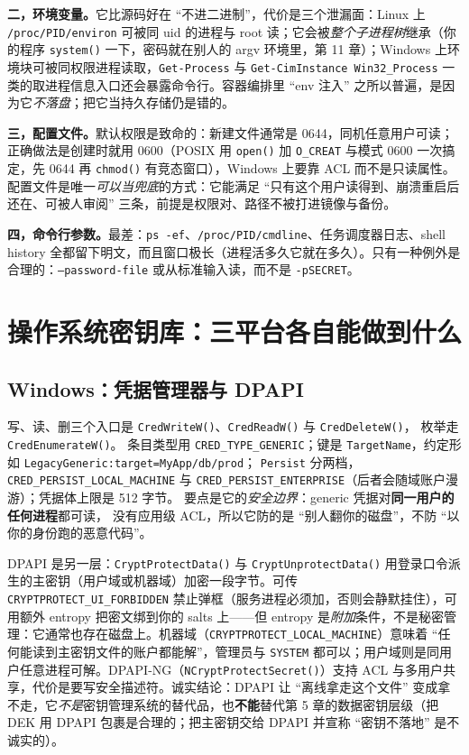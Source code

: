 \documentclass[12pt,a4paper,fontset=fandol]{ctexbook}
\newcommand{\Fn}[1]{\texttt{#1()}}
\newcommand{\Tp}[1]{\texttt{#1}}
\begin{document}
\textbf{二，环境变量。}它比源码好在 ``不进二进制''，代价是三个泄漏面：Linux 上 \Tp{/proc/PID/\allowbreak{}\allowbreak environ} 可被同 uid 的进程与 root 读；它会被\emph{整个子进程树}继承（你的程序 \Fn{system} 一下，密码就在别人的 argv 环境里，第 11 章）；Windows 上环境块可被同权限进程读取，\texttt{Get-Process} 与 \Tp{Get-CimInstance Win32\_Process} 一类的取进程信息入口还会暴露命令行。容器编排里 ``env 注入'' 之所以普遍，是因为它\emph{不落盘}；把它当持久存储仍是错的。

\textbf{三，配置文件。}默认权限是致命的：新建文件通常是 0644，同机任意用户可读；正确做法是创建时就用 0600（POSIX 用 \Fn{open} 加 \Tp{O\_CREAT} 与模式 0600 一次搞定，先 0644 再 \Fn{chmod} 有竞态窗口），Windows 上要靠 ACL 而不是只读属性。配置文件是唯一\emph{可以当兜底}的方式：它能满足 ``只有这个用户读得到、崩溃重启后还在、可被人审阅'' 三条，前提是权限对、路径不被打进镜像与备份。

\textbf{四，命令行参数。}最差：\texttt{ps -ef}、\Tp{/proc/PID/\allowbreak{}\allowbreak cmdline}、任务调度器日志、shell history 全都留下明文，而且窗口极长（进程活多久它就在多久）。只有一种例外是合理的：\texttt{--password-file} 或从标准输入读，而不是 \texttt{-pSECRET}。

\section{操作系统密钥库：三平台各自能做到什么}

\subsection{Windows：凭据管理器与 DPAPI}

写、读、删三个入口是 \Fn{CredWriteW}、\Fn{CredReadW} 与 \Fn{CredDeleteW}，
枚举走 \Fn{Cred\allowbreak{}EnumerateW}。
条目类型用 \Tp{CRED\_\allowbreak{}TYPE\_\allowbreak{}GENERIC}；键是 \Tp{TargetName}，约定形如
\Tp{Legacy\allowbreak{}Generic:\allowbreak target=My\allowbreak{}App/\allowbreak{}db/\allowbreak{}prod}；
\Tp{Persist} 分两档，\Tp{CRED\_\allowbreak{}PERSIST\_\allowbreak{}LOCAL\_\allowbreak{}MACHINE} 与
\Tp{CRED\_\allowbreak{}PERSIST\_\allowbreak{}ENTERPRISE}（后者会随域账户漫游）；凭据体上限是 512 字节。
要点是它的\emph{安全边界}：generic 凭据对\textbf{同一用户的任何进程}都可读，
没有应用级 ACL，所以它防的是 ``别人翻你的磁盘''，不防 ``以你的身份跑的恶意代码''。

DPAPI 是另一层：\Fn{Crypt\allowbreak{}Protect\allowbreak{}Data} 与 \Fn{Crypt\allowbreak{}Unprotect\allowbreak{}Data} 用登录口令派生的主密钥（用户域或机器域）加密一段字节。可传 \Tp{CRYPTPROTECT\_\allowbreak{}UI\_\allowbreak{}FORBIDDEN} 禁止弹框（服务进程必须加，否则会静默挂住），可用额外 entropy 把密文绑到你的 salts 上——但 entropy 是\emph{附加}条件，不是秘密管理：它通常也存在磁盘上。机器域（\Tp{CRYPTPROTECT\_\allowbreak{}LOCAL\_\allowbreak{}MACHINE}）意味着 ``任何能读到主密钥文件的账户都能解''，管理员与 \Tp{SYSTEM} 都可以；用户域则是同用户任意进程可解。DPAPI-NG（\Fn{NCrypt\allowbreak{}Protect\allowbreak{}Secret}）支持 ACL 与多用户共享，代价是要写安全描述符。诚实结论：DPAPI 让 ``离线拿走这个文件'' 变成拿不走，它\emph{不是}密钥管理系统的替代品，也\textbf{不能}替代第 5 章的数据密钥层级（把 DEK 用 DPAPI 包裹是合理的；把主密钥交给 DPAPI 并宣称 ``密钥不落地'' 是不诚实的）。
\end{document}
